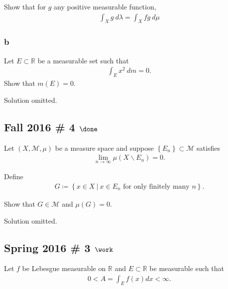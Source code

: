 Show that for \(g\) any positive measurable function,
\begin{align*}
\int_{X} g ~d \lambda=\int_{X} f g ~d \mu
\end{align*}

\hypertarget{b-5}{%
\subsubsection{b}\label{b-5}}

Let \(E \subset {\mathbb{R}}\) be a measurable set such that
\begin{align*}
\int_{E} x^{2} ~d m=0.
\end{align*}
Show that \(m(E) = 0\).

Solution omitted.

\hypertarget{fall-2016-4-done}{%
\subsection{\texorpdfstring{Fall 2016 \# 4
\(\done\)}{Fall 2016 \# 4 \textbackslash done}}\label{fall-2016-4-done}}

Let \((X, \mathcal M, \mu)\) be a measure space and suppose
\(\left\{{E_n}\right\} \subset \mathcal M\) satisfies
\begin{align*}
\lim _{n \rightarrow \infty} \mu\left(X \backslash E_{n}\right)=0.
\end{align*}

Define
\begin{align*}
G \coloneqq\left\{{x\in X {~\mathrel{\Big|}~}x\in E_n \text{ for only finitely many  } n}\right\}.
\end{align*}

Show that \(G \in \mathcal M\) and \(\mu(G) = 0\).


Solution omitted.

\hypertarget{spring-2016-3-work}{%
\subsection{\texorpdfstring{Spring 2016 \# 3
\(\work\)}{Spring 2016 \# 3 \textbackslash work}}\label{spring-2016-3-work}}

Let \(f\) be Lebesgue measurable on \({\mathbb{R}}\) and
\(E \subset {\mathbb{R}}\) be measurable such that
\begin{align*}
0<A=\int_{E} f(x) d x<\infty.
\end{align*}

